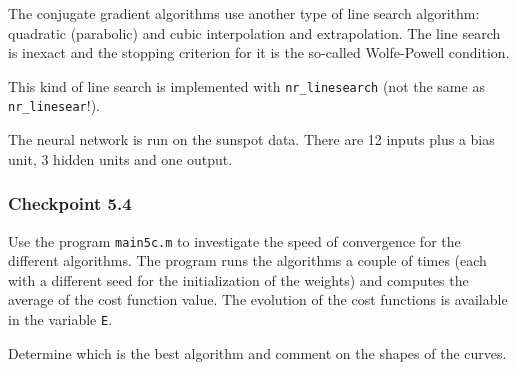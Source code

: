 \documentclass[12pt]{article}
\begin{document}
The conjugate gradient algorithms use another type of line search
algorithm: quadratic (parabolic) and cubic interpolation and
extrapolation. The line search is inexact and
the stopping criterion for it is the so-called Wolfe-Powell condition.

This kind of line search is implemented with {\tt nr\_linesearch}
(not the same as {\tt nr\_linesear}!).

The neural network is run on the sunspot data. There are 12 inputs
plus a bias unit, 3 hidden units and one output.


\subsubsection*{Checkpoint 5.4}

Use the program {\tt main5c.m} to investigate the speed of
convergence for the different algorithms. The program runs the
algorithms a couple of times (each with a different seed for the
initialization of the weights) and computes the average of the
cost function value. The evolution of the cost functions is
available in the variable {\tt E}.

Determine which is the best algorithm and comment on the shapes of the
curves.
\end{document}
